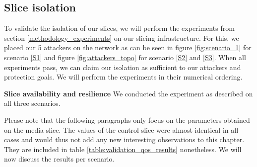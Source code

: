 \subsection{Slice isolation}
To validate the isolation of our slices, we will perform the experiments from section \ref{methodology_experiments} on our slicing infrastructure. For this, we placed our 5 attackers on the network as can be seen in figure \ref{fig:scenario_1} for scenario \ref{S1} and figure \ref{fig:attackers_topo} for scenario \ref{S2} and \ref{S3}. When all experiments pass, we can claim our isolation as sufficient to our attackers and protection goals.
We will perform the experiments in their numerical ordering.

\begin{description}[style=multiline, labelwidth=0.7cm]
    \item[\ref{E1}] \textbf{Slice availability and resilience} We conducted the experiment as described on all three scenarios.

    Please note that the following paragraphs only focus on the parameters obtained on the media slice. The values of the control slice were almost identical in all cases and would thus not add any new interesting observations to this chapter. They are included in table \ref{table:validation_qos_results} nonetheless. We will now discuss the results per scenario.


\end{description}
